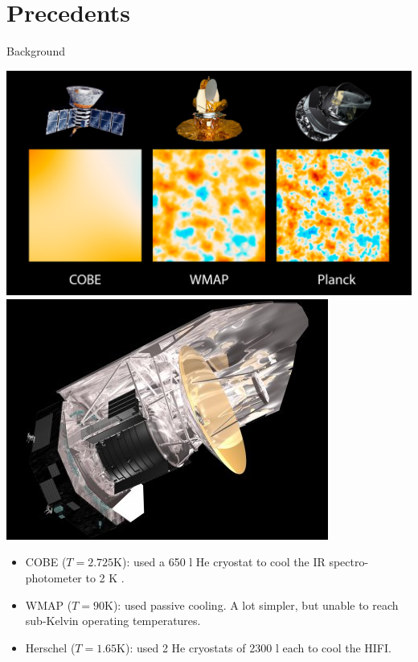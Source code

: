 \section{Precedents}
\begin{frame}{Background}

    \begin{minipage}{0.4\textwidth}
    \includegraphics[width=0.9\linewidth]{Figures/planck3.jpg} \\
    \includegraphics[width=0.9\linewidth]{Figures/herschel.jpg}
    \end{minipage}
    \begin{minipage}{0.55\textwidth}

   
         \begin{itemize}
         \item COBE ($T=2.725 \text{K}$): used a 650 l He cryostat to cool the IR spectro-photometer to 2 K .
         \item WMAP ($T=90 \text{K}$): used passive cooling. A lot simpler, but unable to reach sub-Kelvin operating temperatures.
         \item Herschel ($T=1.65 \text{K}$):  used 2 He cryostats of 2300 l each to cool the HIFI.

         \end{itemize}
    \end{minipage}
\end{frame}




